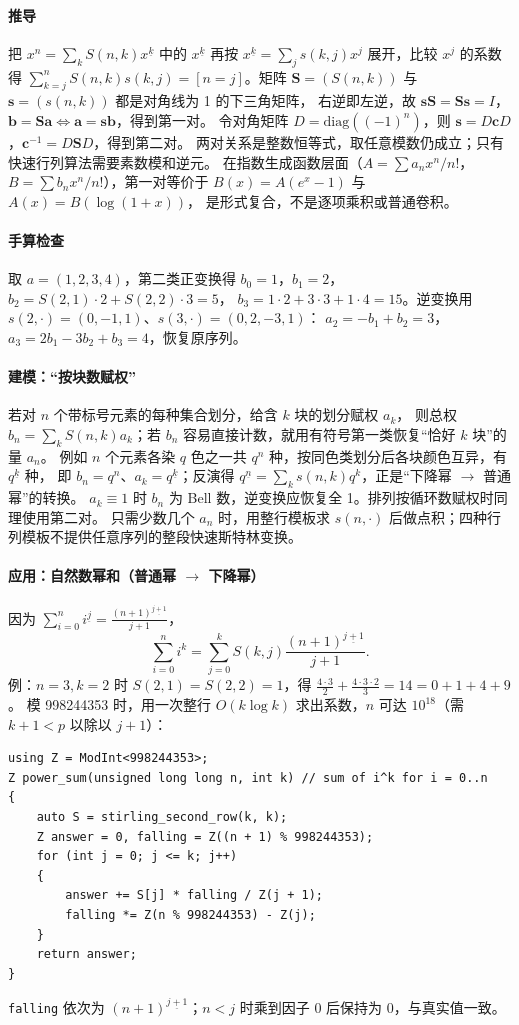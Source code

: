 \paragraph{推导} 把 $x^n=\sum_k S(n,k)x^{\underline k}$ 中的 $x^{\underline k}$ 再按 $x^{\underline k}=\sum_j s(k,j)x^j$ 展开，比较 $x^j$ 的系数得
$\sum_{k=j}^n S(n,k)s(k,j)=[n=j]$。矩阵 $\mathbf S=(S(n,k))$ 与 $\mathbf s=(s(n,k))$ 都是对角线为 1 的下三角矩阵，
右逆即左逆，故 $\mathbf s\mathbf S=\mathbf S\mathbf s=I$，$\mathbf b=\mathbf S\mathbf a\iff\mathbf a=\mathbf s\mathbf b$，得到第一对。
令对角矩阵 $D=\mathrm{diag}((-1)^n)$，则 $\mathbf s=D\mathbf cD$，$\mathbf c^{-1}=D\mathbf SD$，得到第二对。
两对关系是整数恒等式，取任意模数仍成立；只有快速行列算法需要素数模和逆元。
在指数生成函数层面（$A=\sum a_nx^n/n!$，$B=\sum b_nx^n/n!$），第一对等价于 $B(x)=A(e^x-1)$ 与 $A(x)=B(\log(1+x))$，
是形式复合，不是逐项乘积或普通卷积。

\paragraph{手算检查} 取 $a=(1,2,3,4)$，第二类正变换得 $b_0=1$，$b_1=2$，$b_2=S(2,1)\cdot2+S(2,2)\cdot3=5$，
$b_3=1\cdot2+3\cdot3+1\cdot4=15$。逆变换用 $s(2,\cdot)=(0,-1,1)$、$s(3,\cdot)=(0,2,-3,1)$：
$a_2=-b_1+b_2=3$，$a_3=2b_1-3b_2+b_3=4$，恢复原序列。

\paragraph{建模：“按块数赋权”} 若对 $n$ 个带标号元素的每种集合划分，给含 $k$ 块的划分赋权 $a_k$，
则总权 $b_n=\sum_kS(n,k)a_k$；若 $b_n$ 容易直接计数，就用有符号第一类恢复“恰好 $k$ 块”的量 $a_n$。
例如 $n$ 个元素各染 $q$ 色之一共 $q^n$ 种，按同色类划分后各块颜色互异，有 $q^{\underline k}$ 种，
即 $b_n=q^n$、$a_k=q^{\underline k}$；反演得 $q^{\underline n}=\sum_ks(n,k)q^k$，正是“下降幂 $\to$ 普通幂”的转换。
$a_k\equiv1$ 时 $b_n$ 为 Bell 数，逆变换应恢复全 1。排列按循环数赋权时同理使用第二对。
只需少数几个 $a_n$ 时，用整行模板求 $s(n,\cdot)$ 后做点积；四种行列模板不提供任意序列的整段快速斯特林变换。

\paragraph{应用：自然数幂和（普通幂 $\to$ 下降幂）} 因为 $\sum_{i=0}^{n}i^{\underline j}=\frac{(n+1)^{\underline{j+1}}}{j+1}$，
\[
 \sum_{i=0}^{n}i^k=\sum_{j=0}^{k}S(k,j)\frac{(n+1)^{\underline{j+1}}}{j+1}.
\]
例：$n=3,k=2$ 时 $S(2,1)=S(2,2)=1$，得 $\frac{4\cdot3}{2}+\frac{4\cdot3\cdot2}{3}=14=0+1+4+9$。
模 998244353 时，用一次整行 $O(k\log k)$ 求出系数，$n$ 可达 $10^{18}$（需 $k+1<p$ 以除以 $j+1$）：
\begin{lstlisting}
using Z = ModInt<998244353>;
Z power_sum(unsigned long long n, int k) // sum of i^k for i = 0..n
{
    auto S = stirling_second_row(k, k);
    Z answer = 0, falling = Z((n + 1) % 998244353);
    for (int j = 0; j <= k; j++)
    {
        answer += S[j] * falling / Z(j + 1);
        falling *= Z(n % 998244353) - Z(j);
    }
    return answer;
}
\end{lstlisting}
\texttt{falling} 依次为 $(n+1)^{\underline{j+1}}$；$n<j$ 时乘到因子 0 后保持为 0，与真实值一致。

